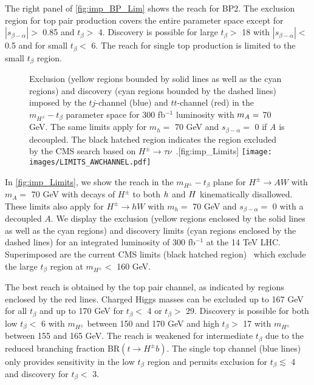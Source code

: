 The right panel of \autoref{fig:imp_BP_Lim} shows the reach for BP2. The exclusion region for top pair production covers the entire parameter space except for $|s_{\beta-\alpha}| >$ 0.85 and $t_{\beta}>$ 4. Discovery is possible for large $t_{\beta}>$ 18 with $|s_{\beta-\alpha}|<$ 0.5 and for small $t_{\beta}<$ 6. The reach for single top production is limited to the small $t_{\beta}$ region.
\begin{figure}
  \begin{sidecaption}{Exclusion (yellow regions bounded by solid lines as well as the cyan regions) and discovery (cyan regions bounded by the dashed lines) imposed by the $tj$-channel (blue) and $tt$-channel (red) in the $m_{H^{\pm}}-t_{\beta}$ parameter space for 300 fb$^{-1}$ luminosity with $m_A=$ 70 GeV. The same limits apply for $m_{h}=$ 70 GeV and $s_{\beta-\alpha}=$ 0 if \emph{A} is decoupled. The black hatched region indicates the region excluded by the CMS search based on $H^{\pm} \rightarrow \tau \nu$~\cite{CMS:2014cdp}.}[fig:imp_Limits]
 \centering
 	\texttt{[image: images/LIMITS\_AWCHANNEL.pdf]}
  \end{sidecaption}
\end{figure}

In \autoref{fig:imp_Limits}, we show the reach in the $m_{H^{\pm}}-t_{\beta}$ plane for $H^{\pm} \rightarrow AW$ with $m_A=$ 70 GeV with decays of $H^\pm$ to both $h$ and $H$ kinematically disallowed. These limits also apply for $H^{\pm} \rightarrow hW$ with $m_{h}=$ 70 GeV and $s_{\beta-\alpha}=$ 0 with a decoupled $A$. We display the exclusion (yellow regions enclosed by the solid lines as well as the cyan regions) and discovery limits (cyan regions enclosed by the dashed lines) for an integrated luminosity of 300 fb$^{-1}$ at the 14 TeV LHC. Superimposed are the current CMS limits (black hatched region)~\cite{CMS:2014cdp} which exclude the large $t_{\beta}$ region at $m_{H^\pm}<$ 160 GeV. 

The best reach is obtained by the top pair channel, as indicated by regions enclosed by the red lines. Charged Higgs masses can be excluded up to 167 GeV for all $t_{\beta}$ and up to 170 GeV for $t_{\beta}<$ 4 or $t_{\beta}>$ 29. Discovery is possible for both low $t_{\beta}<$ 6 with $m_{H^\pm}$ between 150 and 170 GeV and high $t_{\beta} >$ 17 with $m_{H^\pm}$ between 155 and 165 GeV. The reach is weakened for intermediate $t_{\beta}$ due to the reduced branching fraction BR$(t \rightarrow H^{\pm} b)$. The single top channel (blue lines) only provides sensitivity in the low $t_{\beta}$ region and permits exclusion for $t_{\beta} \lesssim$ 4 and discovery for $t_\beta < $ 3. 


